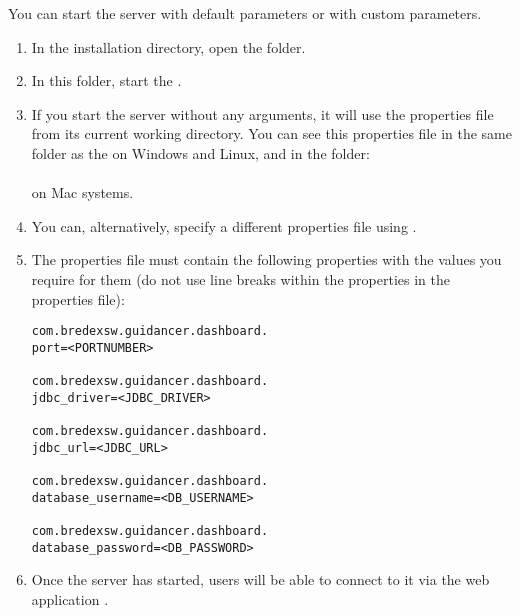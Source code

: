 You can start the \dash{} server with default parameters or with custom parameters. 

\begin{enumerate}
\item In the installation directory, open the  folder. 
\item In this folder, start the . 
\item If you start the server without any arguments, it will use the properties file  from its current working directory. You can see this properties file in the same folder as the  on Windows and Linux, and in the folder:\\
\\
on Mac systems. 
\item You can, alternatively, specify a different properties file using .
\item The properties file must contain the following properties with the values you require for them (do not use line breaks within the properties in the properties file):
\begin{verbatim}
com.bredexsw.guidancer.dashboard.
port=<PORTNUMBER>

com.bredexsw.guidancer.dashboard.
jdbc_driver=<JDBC_DRIVER>

com.bredexsw.guidancer.dashboard.
jdbc_url=<JDBC_URL>

com.bredexsw.guidancer.dashboard.
database_username=<DB_USERNAME>

com.bredexsw.guidancer.dashboard.
database_password=<DB_PASSWORD>
\end{verbatim}
\item Once the \dash{} server has started, users will be able to connect to it via the web application .
\end{enumerate}
